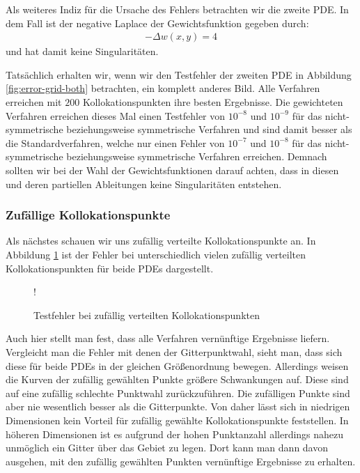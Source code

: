 Als weiteres Indiz für die Ursache des Fehlers betrachten wir die zweite \ac{PDE}. In dem Fall ist der negative Laplace der Gewichtsfunktion gegeben durch:
\begin{align*}
- \Delta w(x,y) = 4
\end{align*}
und hat damit keine Singularitäten.

Tatsächlich erhalten wir, wenn wir den Testfehler der zweiten \ac{PDE} in Abbildung \ref{fig:error-grid-both} betrachten, ein komplett anderes Bild. Alle Verfahren erreichen mit $200$ Kollokationspunkten ihre besten Ergebnisse. Die gewichteten Verfahren erreichen dieses Mal einen Testfehler von $10^{-8}$ und $10^{-9}$ für das nicht-symmetrische beziehungsweise symmetrische Verfahren und sind damit besser als die Standardverfahren, welche nur einen Fehler von $10^{-7}$ und $10^{-8}$ für das nicht-symmetrische beziehungsweise symmetrische Verfahren erreichen. Demnach sollten wir bei der Wahl der Gewichtsfunktionen darauf achten, dass in diesen und deren partiellen Ableitungen keine Singularitäten entstehen.

\subsubsection{Zufällige Kollokationspunkte}
Als nächstes schauen wir uns zufällig verteilte Kollokationspunkte an. In Abbildung \ref{fig:error-random} ist der Fehler bei unterschiedlich vielen zufällig verteilten Kollokationspunkten für beide \acp{PDE} dargestellt.
\begin{figure}[ht]
\centering
\resizebox {\columnwidth} {!} {

}
\caption{Testfehler bei zufällig verteilten Kollokationspunkten}
\label{fig:error-random}
\end{figure}

Auch hier stellt man fest, dass alle Verfahren vernünftige Ergebnisse liefern. Vergleicht man die Fehler mit denen der Gitterpunktwahl, sieht man, dass sich diese für beide \acp{PDE} in der gleichen Größenordnung bewegen. Allerdings weisen die Kurven der zufällig gewählten Punkte größere Schwankungen auf. Diese sind auf eine zufällig schlechte Punktwahl zurückzuführen. Die zufälligen Punkte sind aber nie wesentlich besser als die Gitterpunkte. Von daher lässt sich in niedrigen Dimensionen kein Vorteil für zufällig gewählte Kollokationspunkte feststellen. In höheren Dimensionen ist es aufgrund der hohen Punktanzahl allerdings nahezu unmöglich ein Gitter über das Gebiet zu legen. Dort kann man dann davon ausgehen, mit den zufällig gewählten Punkten vernünftige Ergebnisse zu erhalten.

